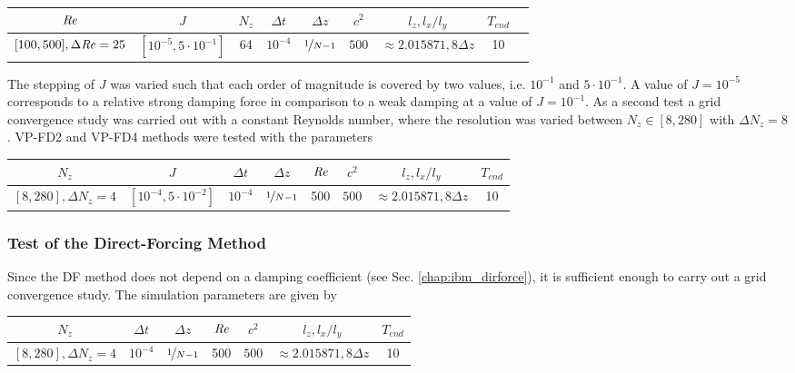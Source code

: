 \begin{center}
\vspace*{0.7ex}
\begin{tabular}{c|c|c|c|c|c|c|c|c }
 $ \mbox{\textit{Re}}  $                      & $J$ & $N_z$ &  $\Delta t$ & $\Delta z$            & $c^2$   & $l_z, l_x/l_y$ & $T_{end}$\\
\hline
 $[100, 500], \Delta \mbox{\textit{Re}} = 25 $& $[10^{-5}, 5\cdot10^{-1}]  $ & 64 &  $10^{-4}$ & $\nicefrac{1}{N - 1}$   & $500$   & $\approx{2.015871}, 8\Delta z$ & 10\\
\end{tabular}
\vspace*{0.7ex}
\end{center}

The stepping of $J$ was varied such that each order of magnitude is covered by two values, i.e. $10^{-1}$ and $5\cdot10^{-1}$.
A value of $J=10^{-5}$ corresponds to a relative strong damping force in comparison to a weak damping at a value of $J=10^{-1}$.
As a second test a grid convergence study was carried out with a constant Reynolds number,
where the resolution was varied between $N_z\in [8, 280]$ with $\Delta N_z = 8$. VP-FD2 and VP-FD4 methods were tested with the parameters

\begin{center}
\vspace*{0.7ex}
\begin{tabular}{c|c|c|c|c|c|c|c }
 $ N_z  $                      & $J$ &  $\Delta t$ & $\Delta z$            & $\mbox{\textit{Re}}$  & $c^2$   & $l_z, l_x/l_y$ & $T_{end}$\\
\hline
 $[8, 280], \Delta N_z = 4 $& $[10^{-4}, 5\cdot10^{-2}]  $ &  $10^{-4}$ & $\nicefrac{1}{N - 1}$ & 500     & $500$   & $\approx{2.015871}, 8\Delta z$  & 10\\
\end{tabular}
\vspace*{0.7ex}
\end{center}

\subsubsection{Test of the Direct-Forcing Method}

Since the DF method does not depend on a damping coefficient (see Sec. \ref{chap:ibm_dirforce}),
it is sufficient enough to carry out a grid convergence study.  The simulation parameters are given by

\begin{center}
\vspace*{0.5ex}
\begin{tabular}{c|c|c|c|c|c|c }
 $ N_z  $                       &  $\Delta t$ & $\Delta z$            & $\mbox{\textit{Re}}$  & $c^2$   & $l_z, l_x/l_y$ & $T_{end}$\\
\hline
 $[8, 280], \Delta N_z = 4 $ &  $10^{-4}$ & $\nicefrac{1}{N - 1}$ & 500     & $500$   & $\approx{2.015871}, 8\Delta z$  & 10\\
\end{tabular}
\vspace*{0.5ex}
\end{center}

